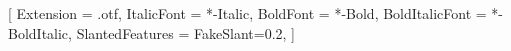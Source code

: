 \usepackage[margin=2.0cm,a5paper]{geometry}
\usepackage{fontspec}
\usepackage{graphicx}
\usepackage[greek,english,portuges]{babel}   %
\usepackage{indentfirst}

\setmainfont{QTOptimum}[
    Extension               = .otf,
    ItalicFont              = *-Italic,
    BoldFont                = *-Bold,
    BoldItalicFont          = *-BoldItalic,
    SlantedFeatures         = {FakeSlant=0.2},
]





